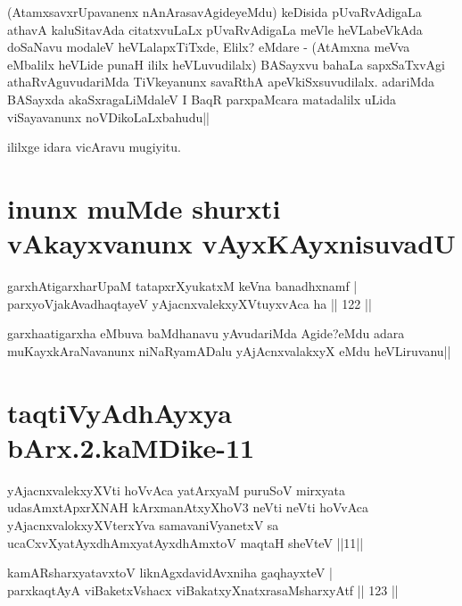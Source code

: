 \begin{artha}
(AtamxsavxrUpavanenx nAnArasavAgideyeMdu) keDisida pUvaRvAdigaLa athavA kaluSitavAda citatxvuLaLx pUvaRvAdigaLa meVle heVLabeVkAda doSaNavu modaleV heVLalapxTiTxde, Elilx? eMdare - (AtAmxna meVva eMbalilx heVLide punaH ililx heVLuvudilalx) BASayxvu bahaLa sapxSaTxvAgi athaRvAguvudariMda TiVkeyanunx savaRthA apeVkiSxsuvudilalx. adariMda BASayxda akaSxragaLiMdaleV I BaqR parxpaMcara matadalilx uLida viSayavanunx noVDikoLaLxbahudu||
\end{artha}

\begin{center}
ililxge idara vicAravu mugiyitu.
\end{center}

\section*{inunx muMde shurxti vAkayxvanunx vAyxKAyxnisuvadU}


\begin{shl}
garxhAtigarxharUpaM tatapxrXyukatxM keVna banadhxnamf |\\
parxyoVjakAvadhaqtayeV yAjacnxvalekxyXVtuyxvAca ha \hfill || 122 ||
\end{shl}

\begin{artha}
garxhaatigarxha eMbuva baMdhanavu yAvudariMda Agide?eMdu adara muKayxkAraNavanunx niNaRyamADalu yAjAcnxvalakxyX eMdu heVLiruvanu||
\end{artha}

\section*{taqtiVyAdhAyxya bArx.2.kaMDike-11}

\begin{shl}
yAjacnxvalekxyXVti hoVvAca yatArxyaM puruSoV mirxyata udasAmxtApxrXNAH kArxmanAtxyXhoV3 neVti neVti hoVvAca yAjacnxvalokxyXV\s terxYva samavaniVyanetxV sa ucaCxvXyatAyxdhAmxyatAyxdhAmxtoV maqtaH sheVteV ||11||
\end{shl}

\begin{shl}
kamARsharxyatavxtoV liknAgxdavidAvxniha gaqhayxteV |\\
parxkaqtAyA viBaketxVshacx viBakatxyXnatxrasaMsharxyAtf \hfill || 123 ||
\end{shl}

